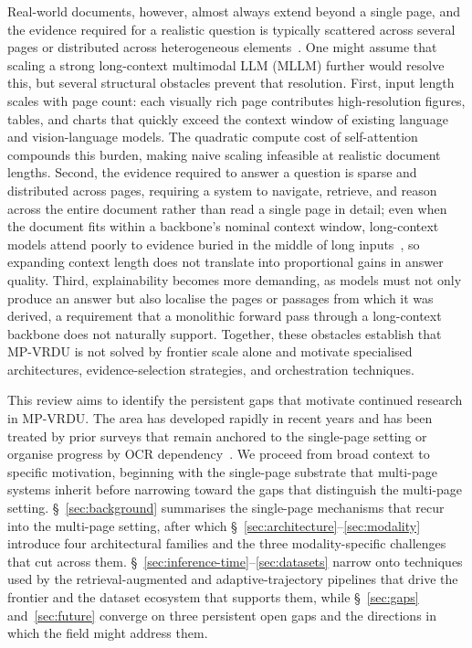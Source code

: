 \documentclass[11pt]{article}
\begin{document}
Real-world documents, however, almost always extend beyond a single page, and the evidence required for a realistic question is typically scattered across several pages or distributed across heterogeneous elements~\cite{tito2023hierarchical,blau2024gram}. One might assume that scaling a strong long-context multimodal LLM (MLLM) further would resolve this, but several structural obstacles prevent that resolution. First, input length scales with page count: each visually rich page contributes high-resolution figures, tables, and charts that quickly exceed the context window of existing language and vision-language models. The quadratic compute cost of self-attention~\cite{vaswani2017attention} compounds this burden, making naive scaling infeasible at realistic document lengths. Second, the evidence required to answer a question is sparse and distributed across pages, requiring a system to navigate, retrieve, and reason across the entire document rather than read a single page in detail; even when the document fits within a backbone's nominal context window, long-context models attend poorly to evidence buried in the middle of long inputs~\cite{liu2024lost}, so expanding context length does not translate into proportional gains in answer quality. Third, explainability becomes more demanding, as models must not only produce an answer but also localise the pages or passages from which it was derived, a requirement that a monolithic forward pass through a long-context backbone does not naturally support. Together, these obstacles establish that MP-VRDU is not solved by frontier scale alone and motivate specialised architectures, evidence-selection strategies, and orchestration techniques.

This review aims to identify the persistent gaps that motivate continued research in MP-VRDU. The area has developed rapidly in recent years and has been treated by prior surveys that remain anchored to the single-page setting or organise progress by OCR dependency~\cite{ding2025survey,gao2025scaling}. We proceed from broad context to specific motivation, beginning with the single-page substrate that multi-page systems inherit before narrowing toward the gaps that distinguish the multi-page setting. \S~\ref{sec:background} summarises the single-page mechanisms that recur into the multi-page setting, after which \S~\ref{sec:architecture}--\ref{sec:modality} introduce four architectural families and the three modality-specific challenges that cut across them. \S~\ref{sec:inference-time}--\ref{sec:datasets} narrow onto techniques used by the retrieval-augmented and adaptive-trajectory pipelines that drive the frontier and the dataset ecosystem that supports them, while \S~\ref{sec:gaps} and~\ref{sec:future} converge on three persistent open gaps and the directions in which the field might address them.
\end{document}

